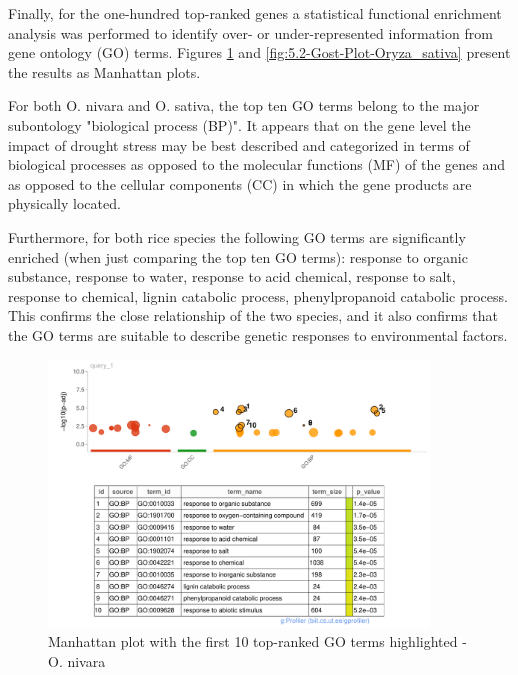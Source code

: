 Finally, for the one-hundred top-ranked genes a statistical functional enrichment analysis was performed to identify over- or under-represented information from gene ontology (GO) terms. Figures \ref{fig:5.2-Gost-Plot-Oryza_nivara} and \ref{fig:5.2-Gost-Plot-Oryza_sativa} present the results as Manhattan plots.

For both O. nivara and O. sativa, the top ten GO terms belong to the major subontology "biological process (BP)". It appears that on the gene level the impact of drought stress may be best described and categorized in terms of biological processes as opposed to the molecular functions (MF) of the genes and as opposed to the cellular components (CC) in which the gene products are physically located.

Furthermore, for both rice species the following GO terms are significantly enriched (when just comparing the top ten GO terms): response to organic substance, response to water, response to acid chemical, response to salt, response to chemical, lignin catabolic process, phenylpropanoid catabolic process. This confirms the close relationship of the two species, and it also confirms that the GO terms are suitable to describe genetic responses to environmental factors.

\begin{figure}[htbp]
    \caption{Manhattan plot with the first 10 top-ranked GO terms highlighted - O. nivara}
    \label{fig:5.2-Gost-Plot-Oryza_nivara}
    \includegraphics[width=0.9\textwidth]{../../results/plots-and-tables/5.2-Gost-Plot-Oryza_nivara}
\end{figure}

